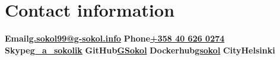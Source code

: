 \documentclass{cv}
\begin{document}
\section* {Contact information}
\textbf{Email}\textbf{\href{mailto:g.sokol99@g-sokol.info}{g.sokol99@g-sokol.info}}\newline
\textbf{Phone}\textbf{\href{tel:+358406260274}{+358 40 626 0274}}\newline
\textbf{Skype}\textbf{\href{skype:g\_a\_sokolik?call}{g\_a\_sokolik}}\newline
\textbf{GitHub}\textbf{\href{https://github.com/GSokol}{GSokol}}\newline
\textbf{Dockerhub}\textbf{\href{https://hub.docker.com/u/gsokol/}{gsokol}}\newline
\textbf{City}\textbf{Helsinki}
\end{document}
